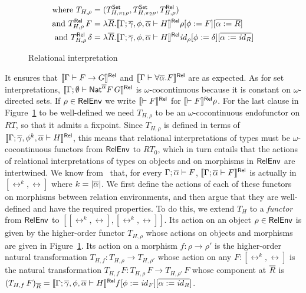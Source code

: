 \documentclass[runningheads]{llncs}
\newcommand{\set}{\mathsf{Set}}
\renewcommand{\id}{\mathit{id}}
\renewcommand{\id}{\mathit{id}}
\begin{document}
\begin{figure}[t]
\begin{adjustbox}{varwidth=5in, max width=5in, fbox, center}
\begin{align*}
  \text{where }	T_{H,\rho}
    &= (T^\set_{H,\pi_1\rho}, T^\set_{H,\pi_2\rho}, T^\rel_{H,\rho}) \\
  \text{and } T^\rel_{H,\rho}\,F
    &= \lambda \ol{R}. \relsem{
      \Gamma;\ol\gamma,\phi,\ol{\alpha} \vdash H}\rho[\phi :=
    F][\ol{\alpha := R}]\\
  \text{and } T^\rel_{H,\rho}\,\delta
    &= \lambda \ol{R}. \relsem{
      \Gamma;\ol\gamma,\phi,\ol{\alpha} \vdash H}\id_\rho[\phi :=
    \delta][\ol{\alpha := \id_R}]
\end{align*}
\vspace*{-0.3in}\caption{Relational
  interpretation}\label{fig:rel-sem} \vspace*{-0.3in} 
\end{adjustbox}\vspace*{-0.15in}
\end{figure}
It ensures that $\llbracket{\Gamma \vdash F \to G}\rrbracket^{\mathsf{Rel}}$ and $\llbracket{\Gamma
  \vdash \forall \overline{\alpha}. F}\rrbracket^{\mathsf{Rel}}$ are as expected.  As for set
interpretations, $\llbracket{\Gamma; \emptyset \vdash \mathsf{Nat}^{\overline{\alpha}}
  F\,G}\rrbracket^{\mathsf{Rel}}$ is $\omega$-cocontinuous because it is constant on
$\omega$-directed sets.  If $\rho \in \mathsf{RelEnv}$ we write
$\llbracket{\vdash F}\rrbracket^{\mathsf{Rel}}$ for $\llbracket{\vdash F}\rrbracket^{\mathsf{Rel}}\rho$.  For the last clause
in Figure~\ref{fig:rel-sem} to be well-defined we need $T_{H,\rho}$ to
be an $\omega$-cocontinuous endofunctor on $RT$, so that it admits a
fixpoint. Since $T_{H,\rho}$ is defined in terms of
$\llbracket{\Gamma;\overline{\gamma},\phi^k, \overline{\alpha} \vdash H}\rrbracket^{\mathsf{Rel}}$, this means
that relational interpretations of types must be $\omega$-cocontinuous
functors from $\mathsf{RelEnv}$ to $RT_0$, which in turn entails that the
actions of relational interpretations of types on objects and on
morphisms in $\mathsf{RelEnv}$ are intertwined.  We know from~\cite{jp19}
that, for every $\Gamma; \overline{\alpha} \vdash F$, $\llbracket{\Gamma;
  \overline{\alpha} \vdash F}\rrbracket^{\mathsf{Rel}}$ is actually in $[\rel^k,\rel]$ where $k =
|\overline{\alpha}|$.  We first define the actions of each of these functors
on morphisms between relation environments, and then argue that they
are well-defined and have the required properties. To do this, we
extend $T_H$ to a {\em functor} from $\mathsf{RelEnv}$ to
$[[\rel^k,\rel],[\rel^k,\rel]]$. Its action on an object $\rho \in
\mathsf{RelEnv}$ is given by the higher-order functor $T_{H,\rho}$ whose
actions on objects and morphisms are given in
Figure~\ref{fig:rel-sem}. Its action on a morphism $f : \rho \to
\rho'$ is the higher-order natural transformation $T_{H,f} :
T_{H,\rho} \to T_{H,\rho'}$ whose action on any $F : [\rel^k,\rel]$ is
the natural transformation $T_{H,f}\, F : T_{H,\rho}\, F \to
T_{H,\rho'}\, F$ whose component at $\overline{R}$ is $(T_{H,f}\,
F)_{\ol{R}} = \relsem{\Gamma; \ol\gamma,\phi,\ol{\alpha} \vdash
  H}f[\phi := \id_F][\ol{\alpha := \id_R}]$.
\end{document}
